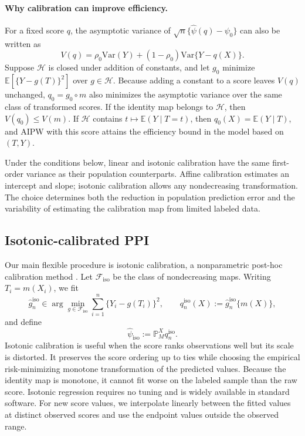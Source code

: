 \documentclass{article}
\theoremstyle{plain}
\theoremstyle{definition}
\newcommand{\E}{\mathbb{E}}
\newcommand{\Var}{\mathrm{Var}}
\newcommand{\1}{\mathbf{1}}
\newcommand{\Pmx}{\mathbb{P}^{X}_M}
\begin{document}
\paragraph{Why calibration can improve efficiency.}
For a fixed score \(q\), the asymptotic variance of
\(\sqrt n\{\widehat\psi(q)-\psi_0\}\) can also be written as
\[
V(q)=\rho_0\Var(Y)
+(1-\rho_0)\Var\{Y-q(X)\}.
\]
Suppose \(\mathcal H\) is closed under addition of constants, and let \(g_0\)
minimize \(\E[\{Y-g(T)\}^2]\) over \(g\in\mathcal H\). Because adding a
constant to a score leaves \(V(q)\) unchanged, \(q_0=g_0\circ m\) also
minimizes the asymptotic variance over the same class of transformed scores.
If the identity map belongs to \(\mathcal H\), then \(V(q_0)\leq V(m)\).
If \(\mathcal H\) contains \(t\mapsto\E(Y\mid T=t)\), then
\(q_0(X)=\E(Y\mid T)\), and AIPW with this score attains the efficiency bound
in the model based on \((T,Y)\).

Under the conditions below, linear and isotonic calibration have the same
first-order variance as their population counterparts. Affine calibration
estimates an intercept and slope; isotonic calibration allows any
nondecreasing transformation. The choice determines both the reduction in
population prediction error and the variability of estimating the calibration
map from limited labeled data.

\subsection{Isotonic-calibrated PPI}
\label{sec:iso}

Our main flexible procedure is isotonic calibration, a nonparametric post-hoc
calibration method
\citep{zadrozny2001obtaining,zadrozny2002transforming,niculescu2005predicting}.
Let \(\mathcal F_{\mathrm{iso}}\) be the class of nondecreasing maps. Writing
\(T_i=m(X_i)\), we fit
\[
\hat g_n^{\mathrm{iso}} \in \arg\min_{g \in \mathcal F_{\mathrm{iso}}}
\sum_{i=1}^n \{Y_i-g(T_i)\}^2,
\qquad
q_n^{\mathrm{iso}}(X):=\hat g_n^{\mathrm{iso}}\{m(X)\},
\]
and define
\[
\widehat{\psi}_{\mathrm{iso}}
:=
\Pmx q_n^{\mathrm{iso}}.
\]
Isotonic calibration is useful when the score ranks observations well but its
scale is distorted. It preserves the score ordering up to ties while choosing
the empirical risk-minimizing monotone transformation of the predicted values.
Because the identity map is monotone, it cannot fit worse on the labeled sample
than the raw score. Isotonic regression requires no tuning and is widely available in standard
software. For new score values, we interpolate linearly between the fitted
values at distinct observed scores and use the endpoint values outside the
observed range.
\end{document}
